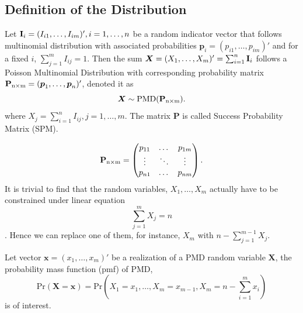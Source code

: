 \documentclass[12pt]{article}
\newcommand{\Ivec}{{\boldsymbol{\rm I}}}
\newcommand{\Xmat}{\mathbf{X}}
\newcommand{\Pmat}{\mathbf{P}}
\newcommand{\pvec}{\boldsymbol{p}}
\newcommand{\PMD}{\textrm{PMD}}
\newcommand{\Xvec}{\boldsymbol{X}}
\newcommand{\xvec}{\boldsymbol{x}}
\begin{document}
\subsection{Definition of the Distribution}

Let $\Ivec_{i} = (I_{i1}, \dots, I_{im})', i=1, \dots, n$ be a random indicator vector that follows multinomial distribution with associated probabilities $\pvec_{i} = (p_{i1}, \dots, p_{im})'$ and for a fixed $i$, $\sum_{j=1}^{m} I_{ij}=1$. Then the sum $\Xvec = (X_{1}, \dots, X_{m})'= \sum_{i=1}^{n}\Ivec_{i}$ follows a Poisson Multinomial Distribution with corresponding probability matrix $\Pmat_{\rm n \times m} = (\pvec_{1}, \dots, \pvec_{n})'$, denoted it as
$$\Xvec \sim \PMD(\Pmat_{\rm n\times m}).$$ where $X_{j} = \sum_{i=1}^{n} I_{ij}, j=1,\dots,m$. The matrix $\Pmat$ is called Success Probability Matrix (SPM).

\begin{equation*}
\Pmat_{\rm n \times m} = \begin{pmatrix}
p_{11} &  \dots & p_{1m} \\
\vdots & \ddots & \vdots \\
p_{n1} &  \dots & p_{nm} \\
\end{pmatrix}.
\end{equation*}
It is trivial to find that the random variables, $X_1, \dots, X_{m}$ actually have to be constrained under linear equation $$\sum_{j=1}^{m}X_{j} = n$$. Hence we can replace one of them, for instance, $X_m$ with $n-\sum_{j=1}^{m-1}X_j$.

Let vector $\xvec = (x_1,\dots,x_m)'$ be a realization of a $\PMD$ random variable $\Xmat$, the probability mass function (pmf) of PMD,
$$\text{Pr}(\Xmat=\xvec) = \text{Pr} \left( X_1 = x_1, \dots, X_m = x_{m-1}, X_{m} = n-\sum_{i=1}^{m}x_i \right)$$
is of interest.
\end{document}
